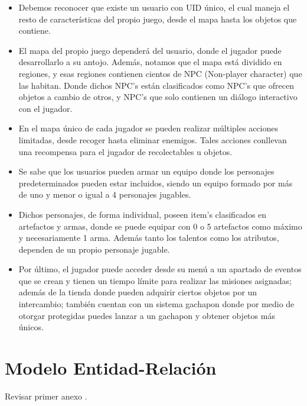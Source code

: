 \documentclass{report}
\begin{document}
\begin{itemize}
    \item Debemos reconocer que existe un usuario con UID único, el cual maneja el resto de características del propio juego, desde el mapa hasta los objetos que contiene.
    \item El mapa del propio juego dependerá del usuario, donde el jugador puede desarrollarlo a su antojo. Además, notamos que el mapa está dividido en regiones, y esas regiones contienen cientos de NPC (Non-player character) que las habitan. Donde dichos NPC’s están clasificados como NPC’s que ofrecen objetos a cambio de otros, y NPC’s que solo contienen un diálogo interactivo con el jugador.
    \item En el mapa único de cada jugador se pueden realizar múltiples acciones limitadas, desde recoger hasta eliminar enemigos. Tales acciones conllevan una recompensa para el jugador de recolectables u objetos.
    \item Se sabe que los usuarios pueden armar un equipo donde los personajes predeterminados pueden estar incluidos, siendo un equipo formado por más de uno y menor o igual a 4 personajes jugables.
    \item Dichos personajes, de forma individual, poseen item’s clasificados en artefactos y armas, donde se puede equipar con 0 o 5 artefactos como máximo y necesariamente 1 arma. Además tanto los talentos como los atributos, dependen de un propio personaje jugable.
    \item Por último, el jugador puede acceder desde su menú a un apartado de eventos que se crean y tienen un tiempo límite para realizar las misiones asignadas; además de la tienda donde pueden adquirir ciertos objetos por un intercambio; también cuentan con un sistema gachapon donde por medio de otorgar protegidas puedes lanzar a un gachapon y obtener objetos más únicos.
\end{itemize}

\section{Modelo Entidad-Relación}
Revisar primer anexo \pageref{Entidad_Relacion}.
\end{document}
